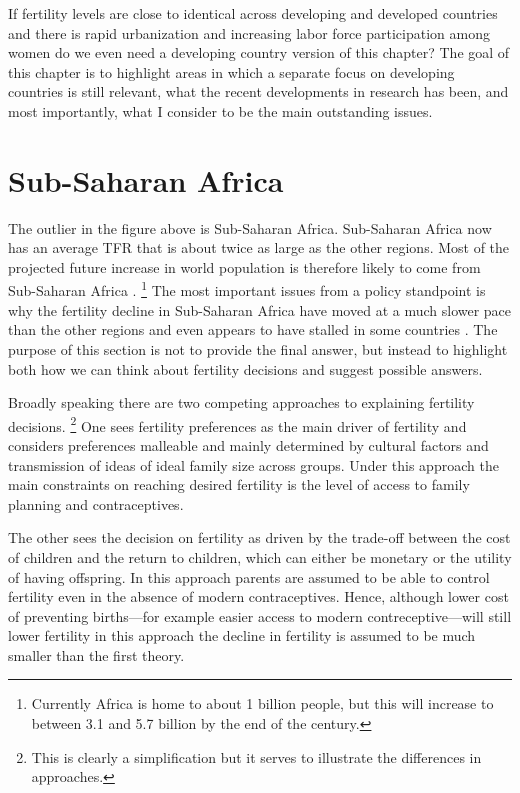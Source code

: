 \documentclass[letterpaper,12pt]{article}
\begin{document}
If fertility levels are close to identical across developing and
developed countries and there is rapid urbanization and increasing
labor force participation among women do we even need a developing 
country version of this chapter?
The goal of this chapter is to highlight areas in which a
separate focus on developing countries is still relevant,
what the recent developments in research has been, and
most importantly, what I consider to be the main
outstanding issues.



\section{Sub-Saharan Africa}

The outlier in the figure above is Sub-Saharan Africa. 
Sub-Saharan Africa now has an average TFR that is about twice
as large as the other regions.
Most of the projected future increase in world population 
is therefore likely to come from Sub-Saharan Africa 
\citep{Gerland2014}.%
\footnote{
Currently Africa is home to about 1 billion people, but this
will increase to between 3.1 and 5.7 billion by the end of
the century.
}
The most important issues from a policy standpoint is why the 
fertility decline in Sub-Saharan Africa have moved at a much
slower pace than the other regions and even appears to
have stalled in some countries \citep{Ainsworth1996a,Singh2017}.
The purpose of this section is not to provide the final answer, but
instead to highlight both how we can think about fertility
decisions and suggest possible answers.

Broadly speaking there are two competing approaches to 
explaining fertility decisions.%
\footnote{
This is clearly a simplification but it serves to illustrate
the differences in approaches.
}
One sees fertility preferences as the main driver of fertility and
considers preferences malleable and mainly determined by cultural 
factors and transmission of ideas of ideal family size across groups.
Under this approach the main constraints on reaching desired 
fertility is the level of access to family planning and 
contraceptives.

The other sees the decision on fertility as driven by the
trade-off between the cost of children and the return to children,
which can either be monetary or the utility of having offspring.
In this approach parents are assumed to be able to control 
fertility even in the absence of modern contraceptives.
Hence, although lower cost of preventing births---for example
easier access to modern contreceptive---will still lower
fertility in this approach the decline in fertility is 
assumed to be much smaller than the first theory.
\end{document}
